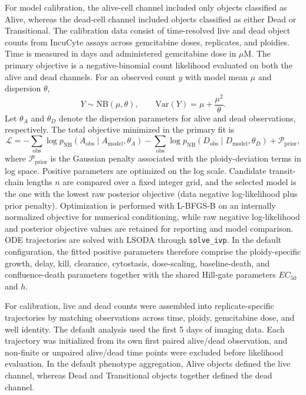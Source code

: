 \documentclass[11pt,notitlepage]{article}
\begin{document}
For model calibration, the alive-cell channel included only objects classified as Alive, whereas the dead-cell channel included objects classified as either Dead or Transitional. The calibration data consist of time-resolved live and dead object counts from IncuCyte assays across gemcitabine doses, replicates, and ploidies. Time is measured in days and administered gemcitabine dose in $\mu$M. The primary objective is a negative-binomial count likelihood evaluated on both the alive and dead channels. For an observed count $y$ with model mean $\mu$ and dispersion $\theta$,
\[
Y\sim\mathrm{NB}(\mu,\theta),
\qquad
\mathrm{Var}(Y)=\mu+\frac{\mu^2}{\theta}.
\]
Let $\theta_A$ and $\theta_D$ denote the dispersion parameters for alive and dead observations, respectively. The total objective minimized in the primary fit is
\[
\mathcal{L}
=
-\sum_{\mathrm{obs}}
\log p_{\mathrm{NB}}\!\left(A_{\mathrm{obs}}\mid A_{\mathrm{model}},\theta_A\right)
-\sum_{\mathrm{obs}}
\log p_{\mathrm{NB}}\!\left(D_{\mathrm{obs}}\mid D_{\mathrm{model}},\theta_D\right)
+\mathcal{P}_{\mathrm{prior}},
\]
where $\mathcal{P}_{\mathrm{prior}}$ is the Gaussian penalty associated with the ploidy-deviation terms in log space. Positive parameters are optimized on the log scale. Candidate transit-chain lengths $n$ are compared over a fixed integer grid, and the selected model is the one with the lowest raw posterior objective (data negative log-likelihood plus prior penalty). Optimization is performed with L-BFGS-B on an internally normalized objective for numerical conditioning, while raw negative log-likelihood and posterior objective values are retained for reporting and model comparison. ODE trajectories are solved with LSODA through \texttt{solve\_ivp}.
In the default configuration, the fitted positive parameters therefore comprise the ploidy-specific growth, delay, kill, clearance, cytostasis, dose-scaling, baseline-death, and confluence-death parameters together with the shared Hill-gate parameters $EC_{50}$ and $h$.

For calibration, live and dead counts were assembled into replicate-specific trajectories by matching observations across time, ploidy, gemcitabine dose, and well identity. The default analysis used the first 5 days of imaging data. Each trajectory was initialized from its own first paired alive/dead observation, and non-finite or unpaired alive/dead time points were excluded before likelihood evaluation. In the default phenotype aggregation, Alive objects defined the live channel, whereas Dead and Transitional objects together defined the dead channel.
\end{document}
